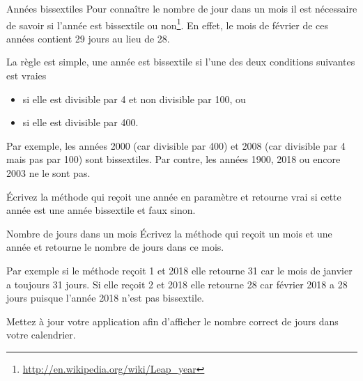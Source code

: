 \documentclass[a4paper,11pt]{style-esi/td}
\begin{document}
 	\begin{Exercice}{Années bissextiles}
	 Pour connaître le nombre de jour dans un mois il est nécessaire de savoir 
	 si l'année est bissextile ou non\footnote{\url{http://en.wikipedia.org/wiki/Leap_year}}. 
	 En effet, le mois de février de ces années contient 29 jours au lieu de 28. 
	 
	 La règle est simple, une année est bissextile si l'une des deux conditions suivantes est vraies
		\begin{itemize}
			\item si elle est divisible par 4 et non divisible par 100, ou
			\item si elle est divisible par 400.
		\end{itemize}
		
		Par exemple, les années 2000 (car divisible par 400) et 2008 (car divisible par 4 mais pas par 100)
		 sont bissextiles.
		 Par contre, les années 1900, 2018 ou encore 2003 ne le sont pas.

		\'Ecrivez la méthode  qui reçoit une année en paramètre et 
		retourne vrai si cette année est une année bissextile et faux sinon.

	\end{Exercice} 



 	\begin{Exercice}{Nombre de jours dans un mois}
		\'Ecrivez la méthode  qui reçoit un mois et une année et 
		retourne le nombre de jours dans ce mois.
		
		Par exemple si le méthode reçoit 1 et 2018 elle retourne 31 car le mois de janvier a toujours 31 jours.
		Si elle reçoit 2 et 2018 elle retourne 28 car février 2018 a 28 jours puisque l'année 2018 n'est pas bissextile.
		
		Mettez à jour votre application afin d'afficher le nombre correct de jours dans votre calendrier.
	\end{Exercice} 
\end{document}
